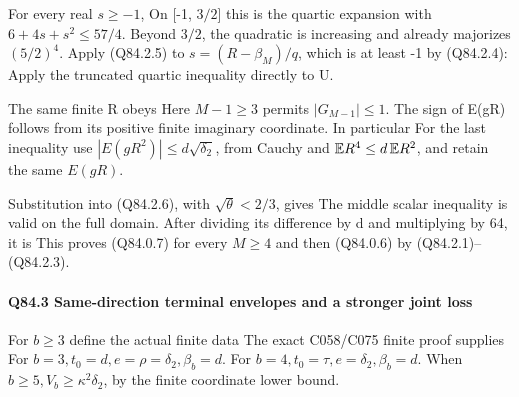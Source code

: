 For every real \(s\ge -1\),
On [-1, \(3/2\)] this is the quartic expansion with
\(6+4s+s^2\le57/4\). Beyond \(3/2\), the quadratic is increasing and
already majorizes \((5/2)^4\). Apply (Q84.2.5) to
\(s=(R-\beta_M)/q\), which is at least -1 by (Q84.2.4):
Apply the truncated quartic inequality directly to U.

The same finite R obeys
Here \(M-1\ge 3\) permits \(|G_{M-1}|\le1\). The sign of E(gR) follows
from its positive finite imaginary coordinate. In particular
For the last inequality use \(|E(gR^2)|\le d\sqrt{\delta_2}\), from
Cauchy and \(\mathbb E R^4\le d\,\allowbreak  \mathbb E R^2\), and retain the same \(E(gR)\).

Substitution into (Q84.2.6), with \(\sqrt\theta<2/3\), gives
The middle scalar inequality is valid on the full domain. After dividing
its difference by d and multiplying by 64, it is
This proves (Q84.0.7) for every \(M\ge 4\) and then (Q84.0.6) by (Q84.2.1)--(Q84.2.3).

\paragraph{Q84.3 Same-direction terminal envelopes and a stronger joint loss}

For \(b\ge 3\) define the actual finite data
The exact C058/C075 finite proof supplies
For \(b=3,\allowbreak  t_0=d,\allowbreak  e=\rho=\delta_2,\allowbreak  \beta_b=d\).
For \(b=4,\allowbreak  t_0=\tau,\allowbreak  e=\delta_2,\allowbreak  \beta_b=d\).
When \(b\ge 5,\allowbreak  V_b\ge\kappa^2\delta_2\), by the finite coordinate lower bound.

